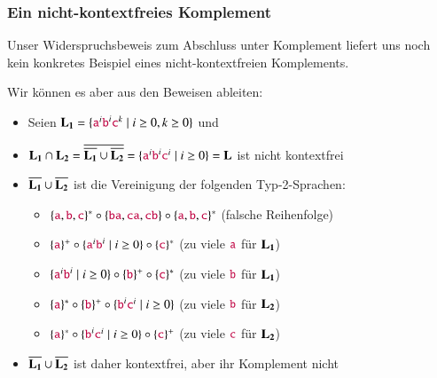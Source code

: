 \documentclass[aspectratio=1610,onlymath]{beamer}
\begin{document}
\begin{frame}\frametitle{Ein nicht-kontextfreies Komplement}

Unser Widerspruchsbeweis zum Abschluss unter Komplement liefert uns noch kein 
konkretes Beispiel eines nicht-kontextfreien Komplements.\pause
\medskip

Wir können es aber aus den Beweisen ableiten:
\begin{itemize}
\item Seien $\Slangsub{L}{1}=\{\Sterm{a}^i\Sterm{b}^i\Sterm{c}^k\mid i\geq 0, k\geq 0\}$ 
und 
%
\item $\Slangsub{L}{1}\cap\Slangsub{L}{2}=\overline{\overline{\Slangsub{L}{1}}\cup\overline{\Slangsub{L}{2}}}=\{\Sterm{a}^i\Sterm{b}^i\Sterm{c}^i\mid i\geq 0\}=\Slang{L}$ ist nicht kontextfrei\pause
%
\item $\overline{\Slangsub{L}{1}}\cup\overline{\Slangsub{L}{2}}$ ist die Vereinigung der folgenden Typ-2-Sprachen:
\begin{itemize}
\item $\{\Sterm{a},\Sterm{b},\Sterm{c}\}^*\circ\{\Sterm{ba},\Sterm{ca},\Sterm{cb}\}\circ\{\Sterm{a},\Sterm{b},\Sterm{c}\}^*$ (falsche Reihenfolge)
\item $\{\Sterm{a}\}^+\circ \{\Sterm{a}^i\Sterm{b}^i\mid i\geq 0\}\circ\{\Sterm{c}\}^*$ \hspace{1.25cm}(zu viele $\Sterm{a}$ für $\Slangsub{L}{1}$)
\item $\{\Sterm{a}^i\Sterm{b}^i\mid i\geq 0\}\circ\{\Sterm{b}\}^+\circ\{\Sterm{c}\}^*$ \hspace{1.25cm}(zu viele $\Sterm{b}$ für $\Slangsub{L}{1}$)
\item $\{\Sterm{a}\}^*\circ\{\Sterm{b}\}^+\circ \{\Sterm{b}^i\Sterm{c}^i\mid i\geq 0\}$ \hspace{1.25cm}(zu viele $\Sterm{b}$ für $\Slangsub{L}{2}$)
\item $\{\Sterm{a}\}^*\circ \{\Sterm{b}^i\Sterm{c}^i\mid i\geq 0\}\circ\{\Sterm{c}\}^+$  \hspace{1.25cm}(zu viele $\Sterm{c}$ für $\Slangsub{L}{2}$)
\end{itemize}
%
\item $\overline{\Slangsub{L}{1}}\cup\overline{\Slangsub{L}{2}}$ ist daher kontextfrei, aber ihr Komplement nicht
\end{itemize}


\end{frame}
\end{document}
